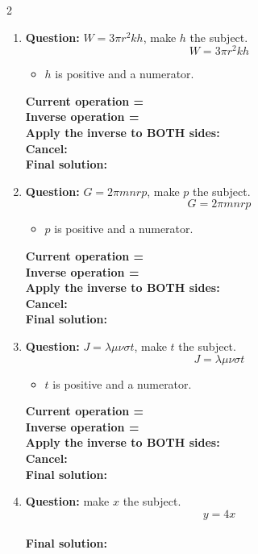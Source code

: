 \documentclass[11pt]{article}
\begin{document}
\begin{multicols}{2}
\begin{enumerate}[leftmargin=*, itemsep=10pt]
\item \textbf{Question:} \( W = 3\pi r^{2}kh \), make \( h \) the subject.
\[
W=3\pi r^{2}kh
\]
\begin{itemize}[leftmargin=*, itemsep=2pt]
\item \(h\) is positive and a numerator.
\end{itemize}
\textbf{Current operation =} \\[1cm]
\textbf{Inverse operation =} \\[1cm]
\textbf{Apply the inverse to BOTH sides:} \\[1.5cm]
\textbf{Cancel:} \\[1.5cm]
\textbf{Final solution:}\\[1.5cm]

\newpage
\item \textbf{Question:} \( G = 2\pi mnrp \), make \( p \) the subject.
\[
G=2\pi mnrp
\]
\begin{itemize}[leftmargin=*, itemsep=2pt]
\item \(p\) is positive and a numerator.
\end{itemize}
\textbf{Current operation =} \\[1cm]
\textbf{Inverse operation =} \\[1cm]
\textbf{Apply the inverse to BOTH sides:} \\[1.5cm]
\textbf{Cancel:} \\[1.5cm]
\textbf{Final solution:}\\[1.5cm]

\item \textbf{Question:} \( J = \lambda \mu \nu \sigma t \), make \( t \) the subject.
\[
J=\lambda\mu\nu\sigma t
\]
\begin{itemize}[leftmargin=*, itemsep=2pt]
\item \(t\) is positive and a numerator.
\end{itemize}
\textbf{Current operation =} \\[1cm]
\textbf{Inverse operation =} \\[1cm]
\textbf{Apply the inverse to BOTH sides:} \\[1.5cm]
\textbf{Cancel:} \\[1.5cm]
\textbf{Final solution:}\\[1.5cm]

\columnbreak
\item \textbf{Question:} make \( x \) the subject.
\[
y=4x
\] \\[4cm]
\textbf{Final solution:}\\[1.5cm]


\end{enumerate}
\end{multicols}
\end{document}
